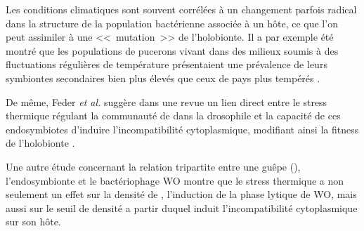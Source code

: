 Les conditions climatiques sont souvent corrélées à un changement parfois radical dans la structure de la population bactérienne associée à un hôte, ce que l'on peut assimiler à une <<~mutation~>> de l'holobionte.
Il a par exemple été montré que les populations de pucerons vivant dans des milieux soumis à des fluctuations régulières de température présentaient une prévalence de leurs symbiontes secondaires bien plus élevés que ceux de pays plus tempérés \cite{harmon2009}.

De même, Feder \textit{et al.} suggère dans une revue un lien direct entre le stress thermique régulant la communauté de  dans la drosophile et la capacité de ces endosymbiotes d'induire l'incompatibilité cytoplasmique, modifiant ainsi la fitness de l'holobionte \cite{feder1999}. 

Une autre étude \cite{bordenstein2011} concernant la relation tripartite entre une guêpe (), l'endosymbionte  et le bactériophage WO montre que le stress thermique a non seulement un effet sur la densité de , l'induction de la phase lytique de WO, mais aussi sur le seuil de densité a partir duquel  induit l'incompatibilité cytoplasmique sur son hôte.
